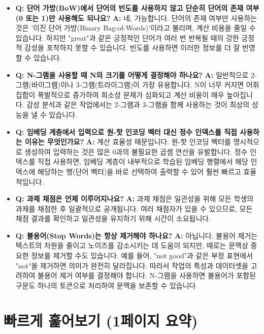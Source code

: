 \documentclass[11pt,a4paper]{article}
\theoremstyle{definition}
\begin{document}
\begin{itemize}
    \item \textbf{Q: 단어 가방(BoW)에서 단어의 빈도를 사용하지 않고 단순히 단어의 존재 여부(0 또는 1)만 사용해도 되나요?}
        \textbf{A:} 네, 가능합니다. 단어의 존재 여부만 사용하는 것은 '이진 단어 가방(Binary Bag-of-Words)'이라고 불리며, 계산 비용을 줄일 수 있습니다. 하지만 "great"과 같은 긍정적인 단어가 여러 번 반복될 때의 강한 긍정적 감성을 포착하지 못할 수 있습니다. 빈도를 사용하면 이러한 정보를 더 잘 반영할 수 있습니다.

    \item \textbf{Q: N-그램을 사용할 때 N의 크기를 어떻게 결정해야 하나요?}
        \textbf{A:} 일반적으로 2-그램(바이그램)이나 3-그램(트라이그램)이 가장 유용합니다. N이 너무 커지면 어휘 집합이 폭발적으로 증가하여 희소성 문제가 심화되고 계산 비용이 매우 높아집니다. 감성 분석과 같은 작업에서는 2-그램과 3-그램을 함께 사용하는 것이 최상의 성능을 낼 수 있습니다.

    \item \textbf{Q: 임베딩 계층에서 입력으로 원-핫 인코딩 벡터 대신 정수 인덱스를 직접 사용하는 이유는 무엇인가요?}
        \textbf{A:} 계산 효율성 때문입니다. 원-핫 인코딩 벡터를 명시적으로 생성하여 입력하는 것은 많은 0과의 불필요한 곱셈 연산을 유발합니다. 정수 인덱스를 직접 사용하면, 임베딩 계층이 내부적으로 학습된 임베딩 행렬에서 해당 인덱스에 해당하는 행(단어 벡터)을 바로 선택하여 출력할 수 있어 훨씬 빠르고 효율적입니다.

    \item \textbf{Q: 과제 채점은 언제 이루어지나요?}
        \textbf{A:} 과제 채점은 일관성을 위해 모든 학생의 과제를 채점한 후 일괄적으로 공개됩니다. 여러 채점자가 있을 수 있으므로, 모든 채점 결과를 확인하고 일관성을 유지하기 위해 시간이 소요됩니다.

    \item \textbf{Q: 불용어(Stop Words)는 항상 제거해야 하나요?}
        \textbf{A:} 아닙니다. 불용어 제거는 텍스트의 차원을 줄이고 노이즈를 감소시키는 데 도움이 되지만, 때로는 문맥상 중요한 정보를 제거할 수도 있습니다. 예를 들어, "not good"과 같은 부정 표현에서 "not"을 제거하면 의미가 완전히 달라집니다. 따라서 작업의 특성과 데이터셋을 고려하여 불용어 제거 여부를 결정해야 합니다. N-그램을 사용하면 불용어가 포함된 구문도 하나의 토큰으로 처리하여 문맥을 보존할 수 있습니다.
\end{itemize}

\newpage
\section{빠르게 훑어보기 (1페이지 요약)}
\end{document}
